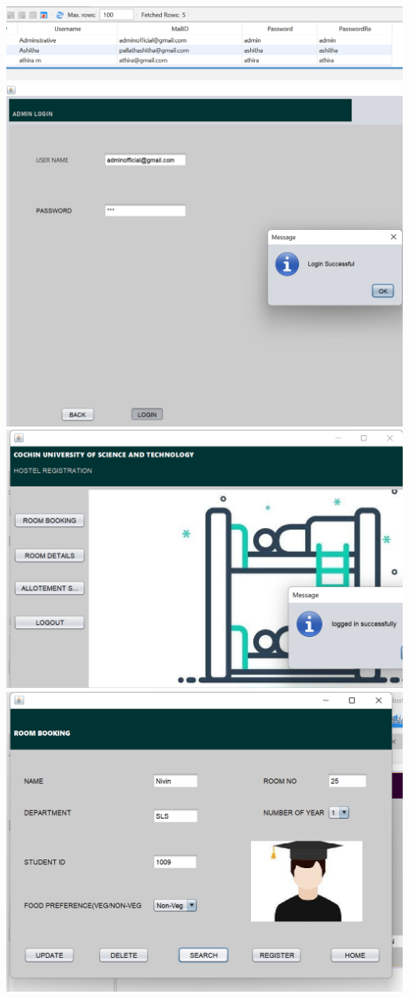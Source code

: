 \documentclass[a4paper,12pt]{report}
\begin{document}
\includegraphics[scale=0.4]{Screenshot (491).png}
\vspace{10mm}
\includegraphics[scale=0.3]{adminlogin.png}
\includegraphics[scale=0.3]{wardenhome.png}
\includegraphics[scale=0.3]{Screenshot (492).png}
\end{document}
